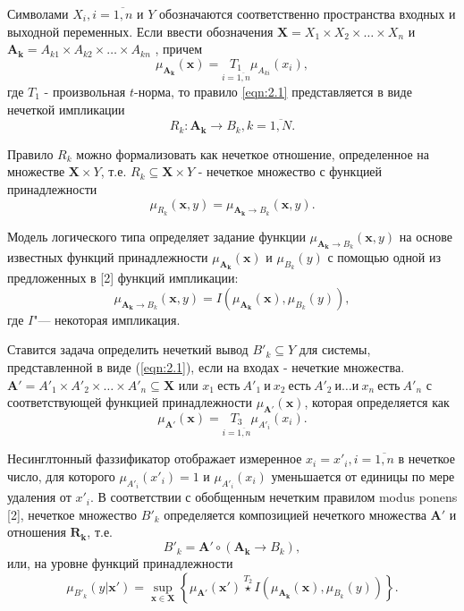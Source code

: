 Символами  $X_i, i=\overline{1,n}$ и $Y$ обозначаются соответственно пространства входных и выходной переменных. Если ввести обозначения $\mathbf{X}=X_1 \times X_2 \times \dots \times X_n$ и $\mathbf{A_k}=A_{k1}\times A_{k2} \times \dots \times A_{kn}$ , причем
\[
\mu_\mathbf{A_k}(\mathbf{x}) = \underset{i=\overline{1,n}}{T_1} \mu_{A_{ki}}(x_i),
\]
где $T_1$ - произвольная $t$-норма, то правило \ref{eqn:2.1} представляется в виде нечеткой импликации
\begin{equation}
	\label{eqn:fuz-problem-2}
	R_k: \mathbf{A_k} \to B_k, k=\overline{1,N}.
\end{equation}

Правило $R_k$ можно формализовать как нечеткое отношение, определенное на множестве  $\mathbf{X}\times Y$, т.е. $R_k \subseteq \mathbf{X} \times Y$ - нечеткое множество с функцией принадлежности
\[
\mu_{R_k}(\mathbf{x}, y) = \mu_{\mathbf{A_k} \to B_k} (\mathbf{x}, y).
\]

Модель логического типа определяет задание функции $\mu_{\mathbf{A_k} \to B_k} (\mathbf{x}, y)$ на основе известных функций принадлежности $\mu_{\mathbf{A_k}}(\mathbf{x})$ и $\mu_{B_k}(y)$ с помощью одной из предложенных в [2] функций импликации:
\[
\mu_{\mathbf{A_k} \to B_k} (\mathbf{x}, y) = I(\mu_{\mathbf{A_k}}(\mathbf{x}), \mu_{B_k}(y)),
\]
где $I$"--- некоторая импликация.

Ставится задача определить нечеткий вывод $B'_k \subseteq Y$ для системы, представленной в виде (\ref{eqn:2.1}), если на входах - нечеткие множества.
$\mathbf{A'}=A'_1 \times A'_2 \times \dots \times A'_n \subseteq \mathbf{X}$ или $x_1\ \text{есть}\ A'_1\ \text{и}\ x_2\ \text{есть}\ A'_2\ \text{и} \dots \text{и}\ x_n\ \text{есть}\ A'_n$  с соответствующей функцией принадлежности $\mu_{\mathbf{A'}}(\mathbf{x})$, которая определяется как
\begin{equation}
	\label{eqn:fuz-problem-3}
	\mu_{\mathbf{A'}}(\mathbf{x}) = \underset{i=\overline{1,n}}{T_3} \mu_{A'_i}(x_i).
\end{equation}

Несинглтонный фаззификатор отображает измеренное $x_i=x'_i, i=\overline{1,n}$ в нечеткое число, для которого $\mu_{A'_i}(x'_i) = 1$ и $\mu_{A'_i}(x_i)$ уменьшается от единицы по мере удаления от  $x'_i$.
В соответствии с обобщенным нечетким правилом modus ponens [2], нечеткое множество $B'_k$ определяется композицией нечеткого множества $\mathbf{A'}$ и отношения $\mathbf{R_k}$, т.е.
\[
B'_k = \mathbf{A'} \circ (\mathbf{A_k} \to B_k),
\]
или, на уровне функций принадлежности
\begin{equation}
	\label{eqn:fuz-problem-4}
	\mu_{B'_k}(y|\mathbf{x'}) = \sup_{\mathbf{x}\in \mathbf{X}}\left\{\mu_{\mathbf{A'}}(\mathbf{x'})\overset{T_2}{\star} I(\mu_{\mathbf{A_k}}(\mathbf{x}), \mu_{B_k}(y))\right\}.
\end{equation}

